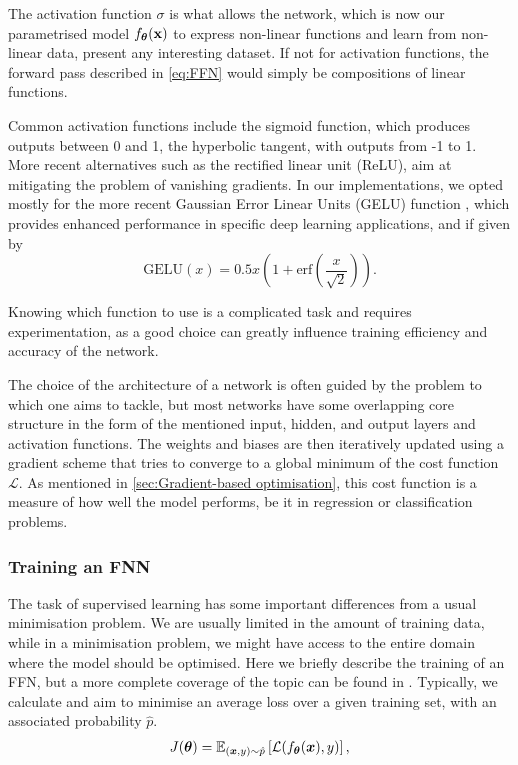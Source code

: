The activation function $\sigma$ is what allows the network, which is now our parametrised model $f_{\boldsymbol{\theta}}(\mathbf{x})$ to express non-linear functions and learn from non-linear data, present any interesting dataset. If not for activation functions, the forward pass described in \eqref{eq:FFN} would simply be compositions of linear functions.

Common activation functions include the sigmoid function, which produces outputs between 0 and 1, the hyperbolic tangent, with outputs from -1 to 1. More recent alternatives such as the rectified linear unit (ReLU), aim at mitigating the problem of vanishing gradients. In our implementations, we opted mostly for the more recent Gaussian Error Linear Units (GELU) function \cite{hendrycks2016gaussian}, which provides enhanced performance in specific deep learning applications, and if given by
\begin{equation*}
    \text{GELU}(x) = 0.5x \left(1 + \text{erf}\left(\frac{x}{\sqrt{2}}\right)\right). 
\end{equation*}

Knowing which function to use is a complicated task and requires experimentation, as a good choice can greatly influence training efficiency and accuracy of the network.

The choice of the architecture of a network is often guided by the problem to which one aims to tackle, but most networks have some overlapping core structure in the form of the mentioned input, hidden, and output layers and activation functions. The weights and biases are then iteratively updated using a gradient scheme that tries to converge to a global minimum of the cost function $\mathcal{L}$. As mentioned in \ref{sec:Gradient-based optimisation}, this cost function is a measure of how well the model performs, be it in regression or classification problems.

\subsubsection{Training an FNN}\label{sec:training a FFN}
The task of supervised learning has some important differences from a usual minimisation problem. We are usually limited in the amount of training data, while in a minimisation problem, we might have access to the entire domain where the model should be optimised. Here we briefly describe the training of an FFN, but a more complete coverage of the topic can be found in \cite{dlbook}. Typically, we calculate and aim to minimise an average loss over a given training set, with an associated probability $\hat{p}$.
\begin{align*}
    J(\boldsymbol{\theta}) = \mathbb{E}_{(\boldsymbol{x}, y)\sim\hat{p}} \left[\mathcal{L}(f_{\boldsymbol{\theta}}(\boldsymbol{x}), y)\right],
\end{align*}

